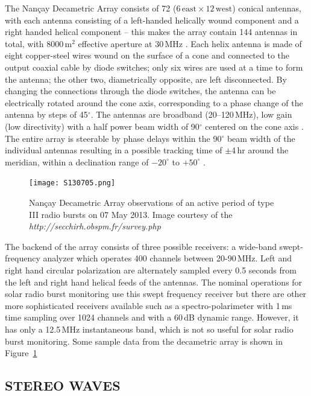 The Nan\c{c}ay Decametric Array consists of 72 ($6\,\mathrm{east} \times12\,\mathrm{west}$) conical antennas, with each antenna consisting of a left-handed helically wound component and a right handed helical component -- this makes the array contain 144 antennas in total, with 8000\,m$^2$ effective aperture at 30\,MHz \citep{lecacheux2000}. Each helix antenna is made of eight copper-steel wires wound on the surface of a cone and connected to the output coaxial cable by diode switches; only six wires are used at a time to form the antenna; the other two, diametrically opposite, are left disconnected. By changing the connections through the diode switches, the antenna can be electrically rotated around the cone axis, corresponding to a phase change of the antenna by steps of 45$^{\circ}$. The antennas are broadband (20--120\,MHz), low gain (low directivity) with a half power beam width of 90$^{\circ}$ centered on the cone axis \citep{boischot1980}. The entire array is steerable by phase delays within the 90$^{\circ}$  beam width of the individual antennas resulting in a possible tracking time of $\pm$4\,hr around the meridian, within a declination range of $-20^{\circ}$ to $+50^{\circ}$ .
\begin{figure}[!t]
\begin{center}
\texttt{[image: S130705.png]}
\caption[Nan\c{c}ay Decametric Array observations]{Nan\c{c}ay Decametric Array observations of an active period of type III radio bursts on 07 May 2013. Image courtesy of the {\it http://secchirh.obspm.fr/survey.php}}
\label{fig:nda_typeIIIs}
\end{center}
\end{figure}

The backend of the array consists of three possible receivers: a wide-band swept-frequency analyzer which operates 400 channels between 20-90\,MHz. Left and right hand circular polarization are alternately sampled every 0.5 seconds from the left and right hand helical feeds of the antennas. The nominal operations for solar radio burst monitoring use this swept frequency receiver but there are other more sophisticated receivers available such as a spectro-polarimeter with 1\,ms time sampling over 1024 channels and with a 60\,dB dynamic range. However, it has only a 12.5\,MHz instantaneous band, which is not so useful for solar radio burst monitoring. Some sample data from the decametric array is shown in Figure~\ref{fig:nda_typeIIIs}


\subsection{STEREO WAVES}\label{sec:31}


